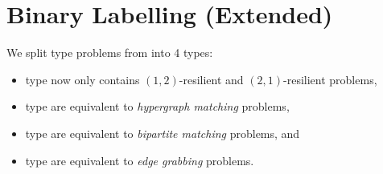 \documentclass[12pt,a4paper]{article}
\begin{document}
\section{Binary Labelling (Extended)}
We split type  problems from \cite{balliu-2019} into 4 types:
\begin{itemize}
    \item type  now only contains $(1,2)$-resilient and $(2,1)$-resilient problems,
    \item type  are equivalent to \emph{hypergraph matching} problems,
    \item type  are equivalent to \emph{bipartite matching} problems, and
    \item type  are equivalent to \emph{edge grabbing} problems.
\end{itemize}

\clearpage
\begin{comment}
\section{Half-edge \texorpdfstring{$(k,\Delta)\hLCEL$}{k,delta-LCEL}}

Class A is a trivially unsolvable class (no valid configuration for half-edges).

Problem classes B correspond to the classes from \cite{balliu-2019}, with the half-edge constraint set to $\colg{11}$. Some allow for relaxations:
\begin{itemize}
    \item Classes B1 and B2 include all possible restrictions of the half-edge constraints, as they cannot make the problem harder than unsolvable.
    \item Class B3.b includes the cases $\y\n$ and $\n\y$, which still allow for the trivial solution of "let white vertices choose what to do"
    \item Classes B4.a and B4.b also include the cases $\y\n$ and $\n\y$ respectively, which still allow for the trivial solutions "no half-edge is selected" and "all half-edges are selected".
\end{itemize}

Problem classes F are "forbidden subgraph" classes; we show they are unsolvable on some specific small trees.

Problem classes G are global problems that derive from global problems without half-edge constraints; since they are strictly harder than corresponding problems in B classes, we only need to show they are solvable. 

%
\clearpage
\end{comment}
\end{document}
